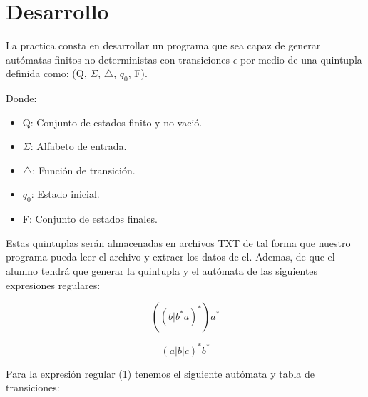 \section{Desarrollo}

La practica consta en desarrollar un programa que sea capaz de generar autómatas finitos no deterministas con transiciones $\epsilon$ por medio de una quintupla definida como: (Q, $\Sigma$, $\triangle$, $q_{0}$, F).

Donde:

\begin{itemize}
\item Q: Conjunto de estados finito y no vació.
\item $\Sigma$: Alfabeto de entrada.
\item $\triangle$: Función de transición.
\item $q_{0}$: Estado inicial.
\item F: Conjunto de estados finales. 
\end{itemize}

Estas quintuplas serán almacenadas en archivos TXT de tal forma que nuestro programa pueda leer el archivo y extraer los datos de el. Ademas, de que el alumno tendrá que generar la quintupla y el autómata de las siguientes expresiones regulares:

\begin{equation}
( ( b | b^{*}a )^{*})a^{*}
\end{equation}

\begin{equation}
( a | b | c )^{*}b^{*}
\end{equation}

Para la expresión regular (1) tenemos el siguiente autómata y tabla de transiciones:

